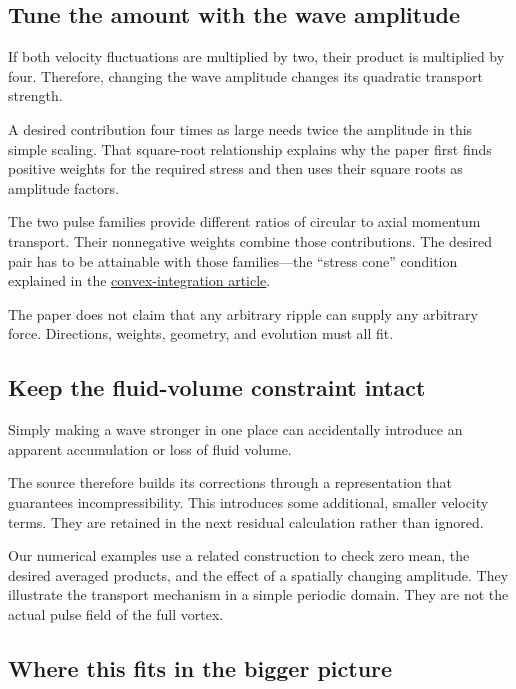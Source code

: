 \documentclass[
  english,
  11pt,
]{article}
\begin{document}
\subsection{Tune the amount with the wave
amplitude}\label{tune-the-amount-with-the-wave-amplitude}

If both velocity fluctuations are multiplied by two, their product is
multiplied by four. Therefore, changing the wave amplitude changes its
quadratic transport strength.

A desired contribution four times as large needs twice the amplitude in
this simple scaling. That square-root relationship explains why the
paper first finds positive weights for the required stress and then uses
their square roots as amplitude factors.

The two pulse families provide different ratios of circular to axial
momentum transport. Their nonnegative weights combine those
contributions. The desired pair has to be attainable with those
families---the ``stress cone'' condition explained in the
\href{../convex-integration/article.html}{convex-integration article}.

The paper does not claim that any arbitrary ripple can supply any
arbitrary force. Directions, weights, geometry, and evolution must all
fit.

\subsection{Keep the fluid-volume constraint
intact}\label{keep-the-fluid-volume-constraint-intact}

Simply making a wave stronger in one place can accidentally introduce an
apparent accumulation or loss of fluid volume.

The source therefore builds its corrections through a representation
that guarantees incompressibility. This introduces some additional,
smaller velocity terms. They are retained in the next residual
calculation rather than ignored.

Our numerical examples use a related construction to check zero mean,
the desired averaged products, and the effect of a spatially changing
amplitude. They illustrate the transport mechanism in a simple periodic
domain. They are not the actual pulse field of the full vortex.

\subsection{Where this fits in the bigger
picture}\label{where-this-fits-in-the-bigger-picture}
\end{document}
